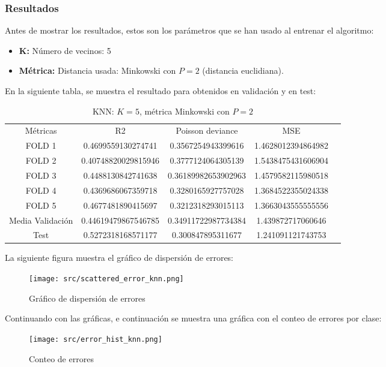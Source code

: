 \subsubsection{Resultados}
Antes de mostrar los resultados, estos son los parámetros que se han usado al entrenar el algoritmo:
\begin{itemize}
	\item \textbf{K:} Número de vecinos: 5
	\item \textbf{Métrica:} Distancia usada: Minkowski con $P=2$ (distancia euclidiana).
\end{itemize}
En la siguiente tabla, se muestra el resultado para obtenidos en validación y en test:\\
\linebreak
\begin{table}[!htbp]
	\begin{tabular}{|c|c|c|c|c}
		\cline{1-4}
		Métricas         & R2                  & Poisson deviance    & MSE                 \\ \cline{1-4}
		FOLD 1           & 0.4699559130274741  & 0.3567254943399616  & 1.4628012394864982  \\ \cline{1-4}
		FOLD 2           & 0.40748820029815946 & 0.3777124064305139  & 1.5438475431606904  \\ \cline{1-4}
		FOLD 3           & 0.4488130842741638  & 0.36189982653902963 & 1.4579582115980518  \\ \cline{1-4}
		FOLD 4           & 0.4369686067359718  & 0.3280165927757028  & 1.3684522355024338  \\ \cline{1-4}
		FOLD 5           & 0.4677481890415697  & 0.3212318293015113  & 1.3663043555555556  \\ \cline{1-4}
		Media Validación & 0.44619479867546785 & 0.34911722987734384 & 1.439872717060646   \\ \cline{1-4}
		Test             & 0.5272318168571177  & 0.300847895311677   & 1.241091121743753   \\ \cline{1-4}
	\end{tabular}
	\caption{KNN: $K=5$, métrica Minkowski con $P=2$}
	\label{tab:knn_res}
\end{table}
\linebreak
La siguiente figura muestra el gráfico de dispersión de errores:\\
\linebreak
\begin{figure}[!htbp]
	\centering
	\texttt{[image: src/scattered\_error\_knn.png]}
	\caption{Gráfico de dispersión de errores}
	\label{fig:knn_scattered}
\end{figure}
\linebreak
Continuando con las gráficas, e continuación se muestra una gráfica con el conteo de errores por clase:\\
\linebreak
\begin{figure}[!htbp]
	\centering
	\texttt{[image: src/error\_hist\_knn.png]}
	\caption{Conteo de errores}
	\label{fig:knn_error_plot}
\end{figure}
\linebreak
